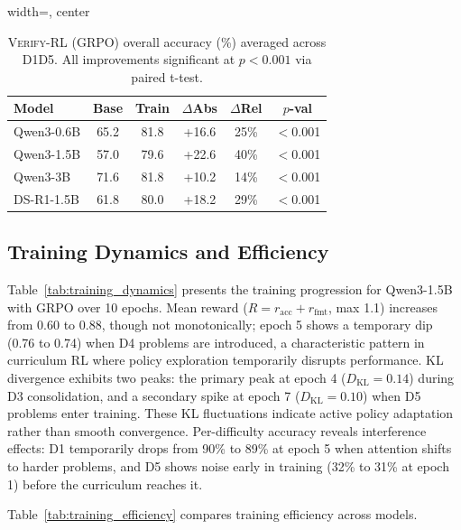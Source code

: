 \documentclass[a4paper,fleqn]{cas-dc}
\theoremstyle{definition}
\begin{document}
\begin{table}[t]
\centering
\caption{\textsc{Verify-RL} (GRPO) overall accuracy (\%) averaged across D1\textendash D5. All improvements significant at $p < 0.001$ via paired t-test.}
\label{tab:overall_results}
\begin{adjustbox}{width=\columnwidth, center} %
\begin{tabular}{@{}lccccc@{}}
\toprule
\textbf{Model} & \textbf{Base} & \textbf{Train} & \textbf{$\Delta$Abs} & \textbf{$\Delta$Rel} & \textbf{$p$-val} \\
\midrule
Qwen3-0.6B & 65.2 & 81.8 & +16.6 & 25\% & $<$0.001 \\
Qwen3-1.5B & 57.0 & 79.6 & +22.6 & 40\% & $<$0.001 \\
Qwen3-3B   & 71.6 & 81.8 & +10.2 & 14\% & $<$0.001 \\
DS-R1-1.5B & 61.8 & 80.0 & +18.2 & 29\% & $<$0.001 \\
\bottomrule
\end{tabular}
\end{adjustbox}
\end{table}

\subsection{Training Dynamics and Efficiency}
Table~\ref{tab:training_dynamics} presents the training progression for Qwen3-1.5B with GRPO over 10 epochs. Mean reward ($R = r_{\text{acc}} + r_{\text{fmt}}$, max 1.1) increases from 0.60 to 0.88, though not monotonically; epoch 5 shows a temporary dip (0.76 to 0.74) when D4 problems are introduced, a characteristic pattern in curriculum RL where policy exploration temporarily disrupts performance. KL divergence exhibits two peaks: the primary peak at epoch 4 ($D_{\text{KL}} = 0.14$) during D3 consolidation, and a secondary spike at epoch 7 ($D_{\text{KL}} = 0.10$) when D5 problems enter training. These KL fluctuations indicate active policy adaptation rather than smooth convergence. Per-difficulty accuracy reveals interference effects: D1 temporarily drops from 90\% to 89\% at epoch 5 when attention shifts to harder problems, and D5 shows noise early in training (32\% to 31\% at epoch 1) before the curriculum reaches it.

Table~\ref{tab:training_efficiency} compares training efficiency across models.
\end{document}
